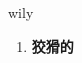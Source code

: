 
\begin{frame}
{\huge wily}
\begin{center}
\begin{enumerate}\Large
  \item \textbf{狡猾的}
\end{enumerate}
\end{center}
\end{frame}
